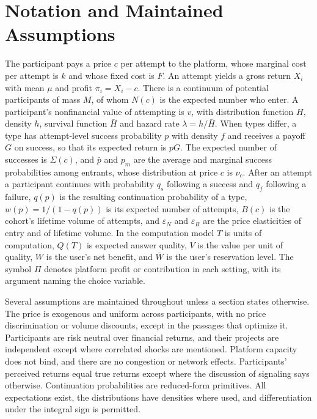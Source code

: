 \documentclass[11pt]{article}
\theoremstyle{remark}
\newcommand{\Hbar}{\bar H}
\begin{document}
\section{Notation and Maintained Assumptions}\label{sec:assump}

The participant pays a price $c$ per attempt to the platform, whose marginal cost per attempt is $k$ and whose fixed cost is $F$. An attempt yields a gross return $X_i$ with mean $\mu$ and profit $\pi_i=X_i-c$. There is a continuum of potential participants of mass $M$, of whom $N(c)$ is the expected number who enter. A participant's nonfinancial value of attempting is $v$, with distribution function $H$, density $h$, survival function $\Hbar$ and hazard rate $\lambda=h/\Hbar$. When types differ, a type has attempt-level success probability $p$ with density $f$ and receives a payoff $G$ on success, so that its expected return is $pG$. The expected number of successes is $\Sigma(c)$, and $\bar p$ and $p_m$ are the average and marginal success probabilities among entrants, whose distribution at price $c$ is $\nu_c$. After an attempt a participant continues with probability $q_s$ following a success and $q_f$ following a failure, $q(p)$ is the resulting continuation probability of a type, $w(p)=1/(1-q(p))$ is its expected number of attempts, $B(c)$ is the cohort's lifetime volume of attempts, and $\varepsilon_N$ and $\varepsilon_B$ are the price elasticities of entry and of lifetime volume. In the computation model $T$ is units of computation, $Q(T)$ is expected answer quality, $V$ is the value per unit of quality, $W$ is the user's net benefit, and $\bar W$ is the user's reservation level. The symbol $\Pi$ denotes platform profit or contribution in each setting, with its argument naming the choice variable.

Several assumptions are maintained throughout unless a section states otherwise. The price is exogenous and uniform across participants, with no price discrimination or volume discounts, except in the passages that optimize it. Participants are risk neutral over financial returns, and their projects are independent except where correlated shocks are mentioned. Platform capacity does not bind, and there are no congestion or network effects. Participants' perceived returns equal true returns except where the discussion of signaling says otherwise. Continuation probabilities are reduced-form primitives. All expectations exist, the distributions have densities where used, and differentiation under the integral sign is permitted.
\end{document}
